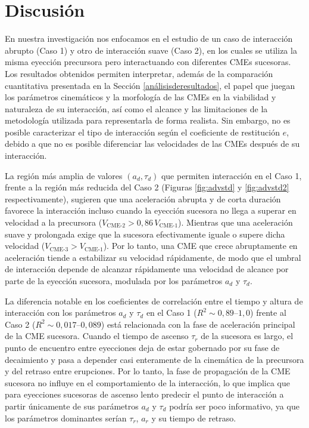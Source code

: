 \chapter{Discusión}
\label{Discusión}
En nuestra investigación nos enfocamos en el estudio de un caso de interacción abrupto (Caso 1) y otro de interacción suave (Caso 2), en los cuales se utiliza la misma eyección precursora pero interactuando con diferentes CMEs sucesoras. Los resultados obtenidos permiten interpretar, además de la comparación cuantitativa presentada en la Sección \ref{análisisderesultados}, el papel que juegan los parámetros cinemáticos y la morfología de las CMEs en la viabilidad y naturaleza de su interacción, así como el alcance y las limitaciones de la metodología utilizada para representarla de forma realista. Sin embargo, no es posible caracterizar el tipo de interacción según el coeficiente de restitución $e$, debido a que no es posible diferenciar las velocidades de las CMEs después de su interacción.

La región más amplia de valores $(a_d, \tau_d)$ que permiten interacción en el Caso 1, frente a la región más reducida del Caso 2 (Figuras \ref{fig:advstd} y \ref{fig:advstd2} respectivamente), sugieren que una aceleración abrupta y de corta duración favorece la interacción incluso cuando la eyección sucesora no llega a superar en velocidad a la precursora ($V_{\text{CME-2}} > 0,86\,V_{\text{CME-1}}$). Mientras que una aceleración suave y prolongada exige que la sucesora efectivamente iguale o supere dicha velocidad ($V_{\text{CME-3}} > V_{\text{CME-1}}$). Por lo tanto, una CME que crece abruptamente en aceleración tiende a estabilizar su velocidad rápidamente, de modo que el umbral de interacción depende de alcanzar rápidamente una velocidad de alcance por parte de la eyección sucesora, modulada por los parámetros $a_d$ y $\tau_d$. 

La diferencia notable en los coeficientes de correlación entre el tiempo y altura de interacción con los parámetros $a_d$ y $\tau_d$ en el Caso 1 ($R^2 \sim 0,89$–$1,0$) frente al Caso 2 ($R^2 \sim 0,017$–$0,089$) está relacionada con la fase de aceleración principal de la CME sucesora. Cuando el tiempo de ascenso $\tau_r$ de la sucesora es largo, el punto de encuentro entre eyecciones deja de estar gobernado por su fase de decaimiento y pasa a depender casi enteramente de la cinemática de la precursora y del retraso entre erupciones. Por lo tanto, la fase de propagación de la CME sucesora no influye en el comportamiento de la interacción, lo que implica que para eyecciones sucesoras de ascenso lento predecir el punto de interacción a partir únicamente de sus parámetros $a_d$ y $\tau_d$ podría ser poco informativo, ya que los parámetros dominantes serían $\tau_r$, $a_r$ y su tiempo de retraso.

